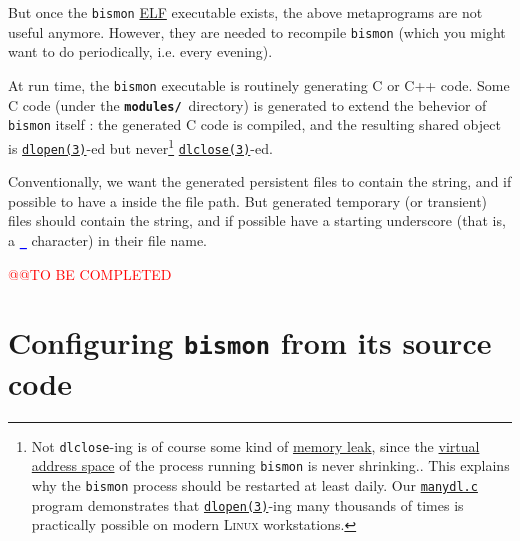 \begin{appendices}
\begin{itemize}
\end{itemize}

But once the \texttt{bismon}
\href{https://en.wikipedia.org/wiki/Executable_and_Linkable_Format}{ELF}
executable exists, the above metaprograms are not useful
anymore. However, they are needed to recompile \texttt{bismon} (which
you might want to do periodically, i.e. every evening).

\medskip

At run time, the \texttt{bismon} executable is routinely generating C
or C++ code. Some C code (under the \textbf{\texttt{modules/}}\,
directory) is generated to extend the behevior of \texttt{bismon}
itself : the generated C code is compiled, and the resulting shared
object is
\href{https://man7.org/linux/man-pages/man3/dlopen.3.html}{\texttt{dlopen(3)}}-ed
but never\footnote{Not \texttt{dlclose}-ing is of course some kind of
\href{https://en.wikipedia.org/wiki/Memory_leak}{memory leak}, since
the \href{https://en.wikipedia.org/wiki/Virtual_address_space}{virtual
  address space} of the process running \texttt{bismon} is never
shrinking.. This explains why the \texttt{bismon} process should be
restarted at least daily.  Our
\href{https://github.com/bstarynk/misc-basile/blob/master/manydl.c}{\texttt{manydl.c}}
program demonstrates that
\href{https://man7.org/linux/man-pages/man3/dlopen.3.html}{\texttt{dlopen(3)}}-ing
many thousands of times is practically possible on modern
\textsc{Linux} workstations.}
\href{https://man7.org/linux/man-pages/man3/dlclose.3.html}{\texttt{dlclose(3)}}-ed.

  Conventionally, we
want the generated persistent files to contain the
\texttt{\textsection} string, and
if possible to have a \texttt{\textsection} inside the file path.  But
generated temporary (or transient) files should contain the
\texttt{\textcurrency} string, and if possible
 have
a starting underscore (that is, a
\textcolor{blue}{\large\textbf{\texttt{\_}}} character) in their file
name.

{\textcolor{red}{\large @@TO BE COMPLETED}}

\section{Configuring \texttt{bismon} from its source code}
\label{sec:configure-bismon}


\end{appendices}
